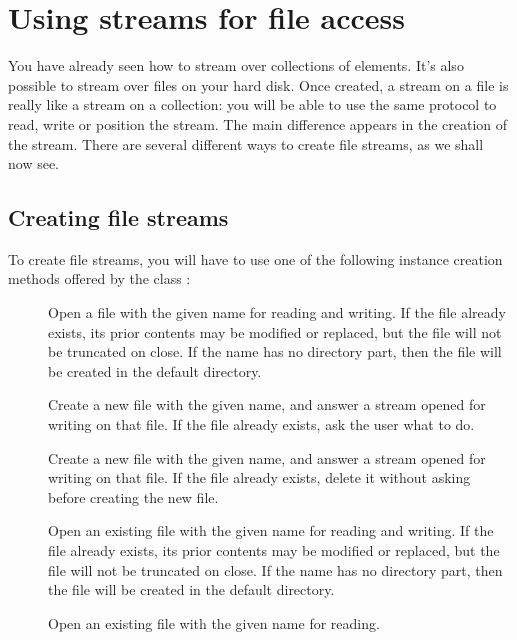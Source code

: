 \documentclass[a4paper,10pt,twoside]{book}
\begin{document}
\section{Using streams for file access}

You have already seen how to stream over collections of elements. It's
also possible to stream over files on your hard disk.
Once created, a stream on a file is really like a stream on a
collection: you will be able to use the same protocol to read, write
or position the stream.
The main difference appears in the creation of the stream.
There are several different ways to create file streams, as we shall now see.

\subsection{Creating file streams}
\label{sec:creat-file-stre}

To create file streams, you will have to use one of the following
instance creation methods offered by the class :

\begin{description}

\item[] Open a file with the given name for reading and
  writing. If the file already exists, its prior contents may be
  modified or replaced, but the file will not be truncated on
  close. If the name has no directory part, then the file will be
  created in the default directory.
  
\item[] Create a new file with the given name,
  and answer a stream opened for writing on that file. If the file
  already exists, ask the user what to do.
  
\item[] Create a new file with the given
  name, and answer a stream opened for writing on that file. If the
  file already exists, delete it without asking before creating the
  new file.

\item[] Open an existing file with the given
  name for reading and writing. If the file already exists, its prior
  contents may be modified or replaced, but the file will not be
  truncated on close. If the name has no directory part, then the file
  will be created in the default directory.

\item[] Open an existing file with the
  given name for reading.

\end{description}
\end{document}
